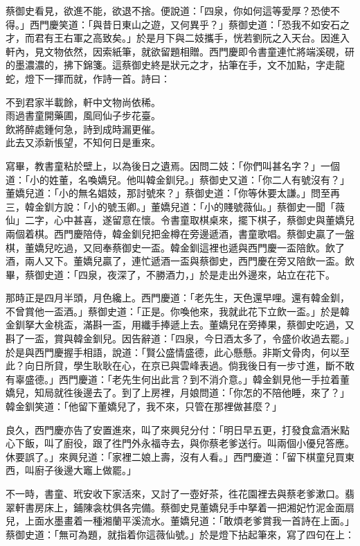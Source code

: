 蔡御史看見，欲進不能，欲退不捨。便說道：「四泉，你如何這等愛厚？恐使不得。」西門慶笑道：「與昔日東山之遊，又何異乎？」蔡御史道：「恐我不如安石之才，而君有王右軍之高致矣。」於是月下與二妓攜手，恍若劉阮之入天台。因進入軒內，見文物依然，因索紙筆，就欲留題相贈。西門慶即令書童連忙將端溪硯，研的墨濃濃的，拂下錦箋。這蔡御史終是狀元之才，拈筆在手，文不加點，字走龍蛇，燈下一揮而就，作詩一首。詩曰：

\begin{myquote} 
不到君家半載餘，軒中文物尚依稀。\\雨過書童開藥圃，風囘仙子步花臺。\\飲將醉處鍾何急，詩到成時漏更催。\\此去又添新悵望，不知何日是重來。
\end{myquote} 

寫畢，教書童粘於壁上，以為後日之遺焉。因問二妓：「你們叫甚名字？」一個道：「小的姓董，名喚嬌兒。他叫韓金釧兒。」蔡御史又道：「你二人有號沒有？」董嬌兒道：「小的無名娼妓，那討號來？」蔡御史道：「你等休要太謙。」問至再三，韓金釧方說：「小的號玉卿。」董嬌兒道：「小的賤號薇仙。」{}蔡御史一聞「薇仙」二字，心中甚喜，遂留意在懷。令書童取棋桌來，擺下棋子，蔡御史與董嬌兒兩個着棋。西門慶陪侍，韓金釧兒把金樽在旁邊遞酒，書童歌唱。蔡御史贏了一盤棋，董嬌兒吃過，又囘奉蔡御史一盃。韓金釧這裡也遞與西門慶一盃陪飲。飲了酒，兩人又下。董嬌兒贏了，連忙遞酒一盃與蔡御史，西門慶在旁又陪飲一盃。飲畢，蔡御史道：「四泉，夜深了，不勝酒力，」於是走出外邊來，站立在花下。

那時正是四月半頭，月色纔上。西門慶道：「老先生，天色還早哩。還有韓金釧，不曾賞他一盃酒。」蔡御史道：「正是。你喚他來，我就此花下立飲一盃。」於是韓金釧拏大金桃盃，滿斟一盃，用纖手捧遞上去。董嬌兒在旁捧果，蔡御史吃過，又斟了一盃，賞與韓金釧兒。因告辭道：「四泉，今日酒太多了，令盛价收過去罷。」於是與西門慶握手相語，說道：「賢公盛情盛德，此心懸懸。非斯文骨肉，何以至此？向日所貸，學生耿耿在心，在京已與雲峰表過。倘我後日有一步寸進，斷不敢有辜盛德。」西門慶道：「老先生何出此言？到不消介意。」韓金釧見他一手拉着董嬌兒，知局就徃後邊去了。到了上房裡，月娘問道：「你怎的不陪他睡，來了？」韓金釧笑道：「他留下董嬌兒了，我不來，只管在那裡做甚麼？」

良久，西門慶亦告了安置進來，叫了來興兒分付：「明日早五更，打發食盒酒米點心下飯，叫了廚役，跟了徃門外永福寺去，與你蔡老爹送行。叫兩個小優兒答應。休要誤了。」來興兒道：「家裡二娘上壽，沒有人看。」西門慶道：「留下棋童兒買東西，叫廚子後邊大竈上做罷。」

不一時，書童、玳安收下家活來，又討了一壺好茶，徃花園裡去與蔡老爹漱口。翡翠軒書房床上，鋪陳衾枕俱各完備。蔡御史見董嬌兒手中拏着一把湘妃竹泥金面扇兒，上面水墨畫着一種湘蘭平溪流水。董嬌兒道：「敢煩老爹賞我一首詩在上面。」蔡御史道：「無可為題，就指着你這薇仙號。」於是燈下拈起筆來，寫了四句在上：

